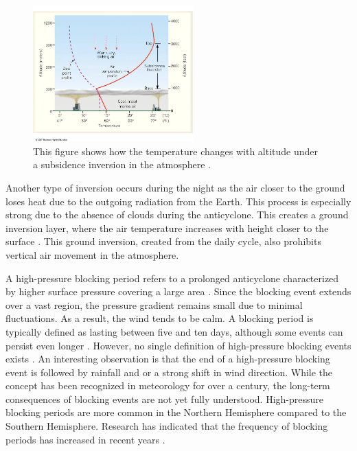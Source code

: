 \begin{figure}[H]
    \centering
    \includegraphics[width=0.55\textwidth]{Figures/subsid_inv_schem.jpg}
    \caption{This figure shows how the temperature changes with altitude under a subsidence inversion in the atmosphere \cite{FormationSubsidenceInversions}.}
    \label{fig:Subsidence_inverion}
\end{figure}

 Another type of inversion occurs during the night as the air closer to the ground loses heat due to the outgoing radiation from the Earth. This process is especially strong due to the absence of clouds during the anticyclone. This creates a ground inversion layer, where the air temperature increases with height closer to the surface \cite{gregohareWeatherClimateClimate2005}. This ground inversion, created from the daily cycle, also prohibits vertical air movement in the atmosphere.

A high-pressure blocking period refers to a prolonged anticyclone characterized by higher surface pressure covering a large area \cite{lupoAtmosphericBlockingEvents2020}. Since the blocking event extends over a vast region, the pressure gradient remains small due to minimal fluctuations. As a result, the wind tends to be calm. A blocking period is typically defined as lasting between five and ten days, although some events can persist even longer \cite{porebskaAnalysisExtremeTemperature2013}. However, no single definition of high-pressure blocking events exists \cite{lupoAtmosphericBlockingEvents2020}. An interesting observation is that the end of a high-pressure blocking event is followed by rainfall and or a strong shift in wind direction. While the concept has been recognized in meteorology for over a century, the long-term consequences of blocking events are not yet fully understood. High-pressure blocking periods are more common in the Northern Hemisphere compared to the Southern Hemisphere. Research has indicated that the frequency of blocking periods has increased in recent years \cite{lupoAtmosphericBlockingEvents2020}. 

